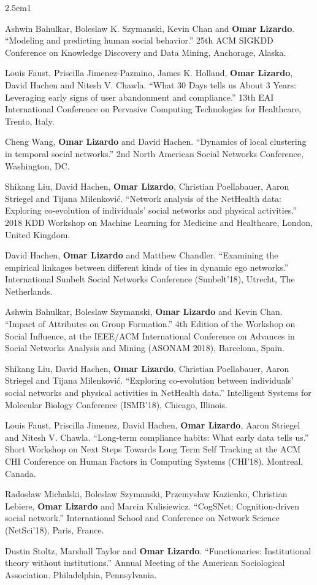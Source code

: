 \documentclass[
]{article}
\newenvironment{cventry}{\begin{hangparas}{2.5em}{1}}{\end{hangparas}}
\begin{document}
\begin{cventry}

Ashwin Bahulkar, Boleslaw K. Szymanski, Kevin Chan and \textbf{Omar
Lizardo}. ``Modeling and predicting human social behavior.'' 25th ACM
SIGKDD Conference on Knowledge Discovery and Data Mining, Anchorage,
Alaska.

Louis Faust, Priscilla Jimenez-Pazmino, James K. Holland, \textbf{Omar
Lizardo}, David Hachen and Nitesh V. Chawla. ``What 30 Days tells us
About 3 Years: Leveraging early signs of user abandonment and
compliance.'' 13th EAI International Conference on Pervasive Computing
Technologies for Healthcare, Trento, Italy.

Cheng Wang, \textbf{Omar Lizardo} and David Hachen. ``Dynamics of local
clustering in temporal social networks.'' 2nd North American Social
Networks Conference, Washington, DC.

Shikang Liu, David Hachen, \textbf{Omar Lizardo}, Christian Poellabauer,
Aaron Striegel and Tijana Milenković. ``Network analysis of the
NetHealth data: Exploring co-evolution of individuals' social networks
and physical activities.'' 2018 KDD Workshop on Machine Learning for
Medicine and Healthcare, London, United Kingdom.

David Hachen, \textbf{Omar Lizardo} and Matthew Chandler. ``Examining
the empirical linkages between different kinds of ties in dynamic ego
networks.'' International Sunbelt Social Networks Conference
(Sunbelt'18), Utrecht, The Netherlands.

Ashwin Bahulkar, Boleslaw Szymanski, \textbf{Omar Lizardo} and Kevin
Chan. ``Impact of Attributes on Group Formation.'' 4th Edition of the
Workshop on Social Influence, at the IEEE/ACM International Conference
on Advances in Social Networks Analysis and Mining (ASONAM 2018),
Barcelona, Spain.

Shikang Liu, David Hachen, \textbf{Omar Lizardo}, Christian Poellabauer,
Aaron Striegel and Tijana Milenković. ``Exploring co-evolution between
individuals' social networks and physical activities in NetHealth
data.'' Intelligent Systems for Molecular Biology Conference (ISMB'18),
Chicago, Illinois.

Louis Faust, Priscilla Jimenez, David Hachen, \textbf{Omar Lizardo},
Aaron Striegel and Nitesh V. Chawla. ``Long-term compliance habits: What
early data tells us.'' Short Workshop on Next Steps Towards Long Term
Self Tracking at the ACM CHI Conference on Human Factors in Computing
Systems (CHI'18). Montreal, Canada.

Radosław Michalski, Boleslaw Szymanski, Przemysław Kazienko, Christian
Lebiere, \textbf{Omar Lizardo} and Marcin Kulisiewicz. ``CogSNet:
Cognition-driven social network.'' International School and Conference
on Network Science (NetSci'18), Paris, France.

Dustin Stoltz, Marshall Taylor and \textbf{Omar Lizardo}.
``Functionaries: Institutional theory without institutions.'' Annual
Meeting of the American Sociological Association. Philadelphia,
Pennsylvania.

\end{cventry}
\end{document}
